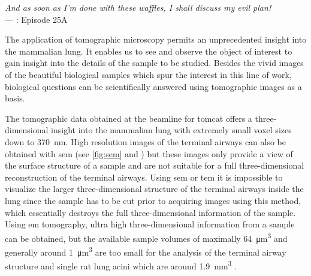 \acresetall
{}\label{ch:discussion}
\begin{flushright}{\slshape And as soon as I'm done with these waffles, I shall discuss my evil plan!} \\ \medskip
	---  \citep{Zim}: Episode 25A
\end{flushright}
\vspace{6cm}

The application of tomographic microscopy permits an un\-prec\-e\-dent\-ed insight into the mammalian lung. It enables us to see and observe the object of interest to gain insight into the details of the sample to be studied. Besides the vivid images of the beautiful biological samples which spur the interest in this line of work, biological questions can be scientifically answered using tomographic images as a basis.

The tomographic data obtained at the beamline for \ac{tomcat} offers a three-dimensional insight into the mammalian lung with extremely small voxel sizes down to \SI{370}{\nano\meter}. High resolution images of the terminal airways  can also be obtained with \ac{sem} (see \autoref{fig:sem} and \cite[Figure 12]{Weibel2009}) but these images only provide a view of the surface structure of a sample and are not suitable for a full three-dimensional reconstruction of the terminal airways. Using \ac{sem} or \ac{tem} it is impossible to visualize the larger three-dimensional structure of the terminal airways inside the lung since the sample has to be cut prior to acquiring images using this method, which essentially destroys the full three-dimensional information of the sample. Using \ac{em} tomography, ultra high three-dimensional information from a sample can be obtained, but the available sample volumes of maximally \SI{64}{\micro\meter\cubed} \cite{Martone2002} and generally around \SI{1}{\micro\meter\cubed} \cite{Lucic2005} are too small for the analysis of the terminal airway structure and single rat lung acini which are around \SI{1.9}{\milli\meter\cubed} \cite{Rodriguez1987}.

